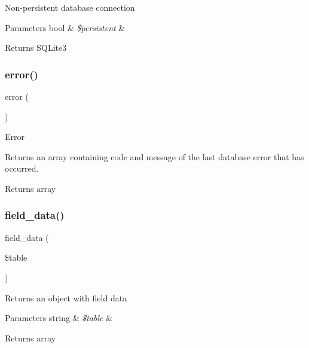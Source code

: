 Non-\/persistent database connection


\begin{DoxyParams}[1]{Parameters}
bool & {\em \$persistent} & \\
\hline
\end{DoxyParams}
\begin{DoxyReturn}{Returns}
S\+Q\+Lite3 
\end{DoxyReturn}
\mbox{\label{class_c_i___d_b__sqlite3__driver_a43b8d30b879d4f09ceb059b02af2bc02}} 
\subsubsection{\texorpdfstring{error()}{error()}}
{\footnotesize\ttfamily error (\begin{DoxyParamCaption}{ }\end{DoxyParamCaption})}

Error

Returns an array containing code and message of the last database error that has occurred.

\begin{DoxyReturn}{Returns}
array 
\end{DoxyReturn}
\mbox{\label{class_c_i___d_b__sqlite3__driver_a90355121e1ed009e0efdbd544ab56efa}} 
\subsubsection{\texorpdfstring{field\+\_\+data()}{field\_data()}}
{\footnotesize\ttfamily field\+\_\+data (\begin{DoxyParamCaption}\item[{}]{\$table }\end{DoxyParamCaption})}

Returns an object with field data


\begin{DoxyParams}[1]{Parameters}
string & {\em \$table} & \\
\hline
\end{DoxyParams}
\begin{DoxyReturn}{Returns}
array 
\end{DoxyReturn}
\mbox{\label{class_c_i___d_b__sqlite3__driver_a933f2cde8dc7f87875e257d0a4902e99}} 
